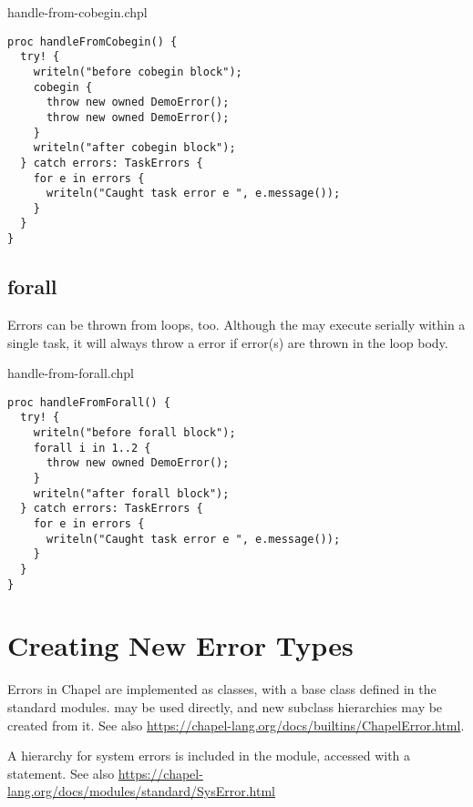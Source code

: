\begin{chapelexample}{handle-from-cobegin.chpl}
\begin{chapel}
\begin{verbatim}
proc handleFromCobegin() {
  try! {
    writeln("before cobegin block");
    cobegin {
      throw new owned DemoError();
      throw new owned DemoError();
    }
    writeln("after cobegin block");
  } catch errors: TaskErrors {
    for e in errors {
      writeln("Caught task error e ", e.message());
    }
  }
}
\end{verbatim}
\end{chapel}
\end{chapelexample}

\subsection{forall}
\label{Errors_forall}

Errors can be thrown from  loops, too.
Although the  may execute serially within
a single task, it will always throw a  error
if error(s) are thrown in the loop body.

\begin{chapelexample}{handle-from-forall.chpl}
\begin{chapel}
\begin{verbatim}
proc handleFromForall() {
  try! {
    writeln("before forall block");
    forall i in 1..2 {
      throw new owned DemoError();
    }
    writeln("after forall block");
  } catch errors: TaskErrors {
    for e in errors {
      writeln("Caught task error e ", e.message());
    }
  }
}
\end{verbatim}
\end{chapel}
\end{chapelexample}


\section{Creating New Error Types}
\label{Creating_New_Error_Types}

Errors in Chapel are implemented as classes, with a base class 
defined in the standard modules.  may be used directly, and new
subclass hierarchies may be created from it.  See also
\url{https://chapel-lang.org/docs/builtins/ChapelError.html}.

A hierarchy for system errors is included in the  module,
accessed with a  statement.  See also
\url{https://chapel-lang.org/docs/modules/standard/SysError.html}

